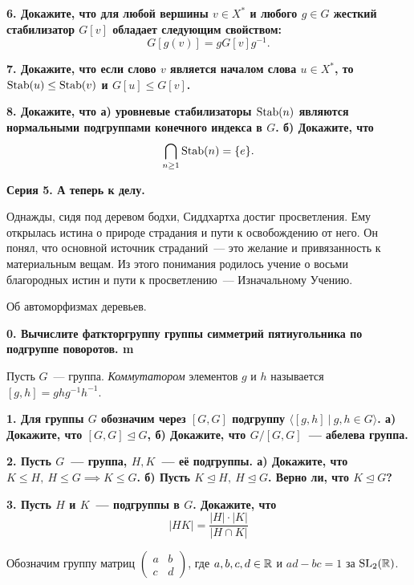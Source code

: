 \documentclass[9pt]{extarticle}
\begin{document}
\begin{landscape}
\begin{multicols}{2}
 	\bf{6.} Докажите, что для любой вершины $v \in X^*$ и любого $g \in G$ жесткий стабилизатор $G[v]$ обладает следующим свойством: 
 	\[
 		G[g(v)] = g G[v] g^{-1}.
 	\]

 	\bf{7.} Докажите, что если слово $v$ является началом слова $u \in X^*$, то $\operatorname{Stab}(u) \le \operatorname{Stab}(v)$ и $G[u] \le G[v]$.

 	\bf{8.} Докажите, что а) уровневые стабилизаторы $\operatorname{Stab}(n)$ являются нормальными подгруппами конечного индекса в $G$. б) Докажите, что  
 	\[
 		\bigcap_{n \ge 1} \operatorname{Stab}(n) = \{ e \}.
 	\]

	

	\columnbreak

	\centerline{\bf{Серия 5. А теперь к делу. }}

	\epigraph{Однажды, сидя под деревом бодхи, Сиддхартха достиг просветления. Ему открылась истина о природе страдания и пути к освобождению от него. Он понял, что основной источник страданий~--- это желание и привязанность к материальным вещам. Из этого понимания родилось учение о восьми благородных истин и пути к просветлению~--- Изначальному Учению.}{Об автоморфизмах деревьев.}

	\bf{0.}  Вычислите фаткторгруппу группы симметрий пятиугольника по подгруппе поворотов. m

	\begin{definition} 
		Пусть $G$~--- группа. \emph{Коммутатором} элементов $g$ и $h$ называется $[g, h] = g h g^{-1} h^{-1}$.
	\end{definition}

	\bf{1.} Для группы $G$ обозначим через $[G, G]$ подгруппу $\langle [g, h] \ \vert \ g, h \in G \rangle$. а) Докажите, что $[G, G] \trianglelefteq G$, б) Докажите, что $G/[G, G]$~--- абелева группа. 

	\bf{2.} Пусть $G$~--- группа, $H, K$~--- её подгруппы. а) Докажите, что $K \le H, \ H \le G \implies K \le G$. б) Пусть $K \trianglelefteq  H, \ H \trianglelefteq  G$. Верно ли, что $K \trianglelefteq  G$?

	\bf{3.} Пусть $H$ и $K$~--- подгруппы в $G$. Докажите, что 
	\[
		|HK| = \frac{|H|\cdot|K|}{|H \cap K|}	
	\]
	\begin{definition} 
		Обозначим группу матриц $\begin{pmatrix} a & b \\ c & d \end{pmatrix}$, где $a, b, c, d \in \mathbb{R}$ и $ad - bc = 1$ за $\mathrm{SL}_{2}(\mathbb{R})$.
	\end{definition}


\end{multicols}
\end{landscape}
\end{document}
